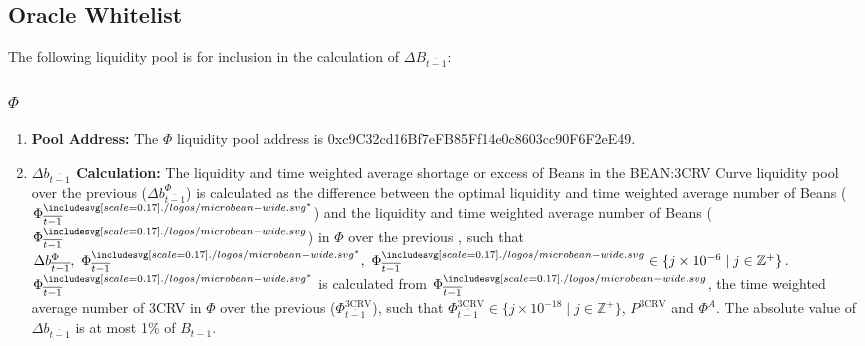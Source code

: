 \documentclass[class=article, crop=false]{standalone}
\begin{document}
\subsection{Oracle Whitelist}
The following liquidity pool is  for inclusion in the calculation of $\Delta B_{\overline{t-1}}$:
\subsubsection{$\Phi$}
    \begin{enumerate}
        \item \textbf{Pool Address:} The $\Phi$ liquidity pool address is 0xc9C32cd16Bf7eFB85Ff14e0c8603cc90F6F2eE49.
        \item \textbf{$\Delta b_{\overline{t-1}}$ Calculation:} The liquidity and time weighted average shortage or excess of Beans in the BEAN:3CRV Curve liquidity pool over the previous  ($\Delta b_{\overline{t-1}}^{\Phi}$) is calculated as the difference between the optimal liquidity and time weighted average number of Beans ($\Phi_{\overline{t-1}}^{{\bean}^*}$) and the liquidity and time weighted average number of Beans ($\Phi_{\overline{t-1}}^{\bean}$) in $\Phi$ over the previous , such that $\Delta b_{\overline{t-1}}^{\Phi},\ \Phi_{\overline{t-1}}^{{\bean}^*},\ \Phi_{\overline{t-1}}^{\bean} \in \{j \times 10^{-6} \mid j \in \mathbb{Z}^{+} \}$. $\Phi_{\overline{t-1}}^{{\bean}^*}$ is calculated from $\Phi_{\overline{t-1}}^{\bean}$, the time weighted average number of 3CRV in $\Phi$ over the previous  ($\Phi_{\overline{t-1}}^{\text{3CRV}}$), such that $\Phi_{\overline{t-1}}^{\text{3CRV}}\in \{j \times 10^{-18} \mid j \in \mathbb{Z}^{+} \}$, $P^{\text{3CRV}}$ and $\Phi^{A}$. The absolute value of $\Delta b_{\overline{t-1}}$ is at most 1\% of $B_{t-1}$.


\end{enumerate}
\end{document}

